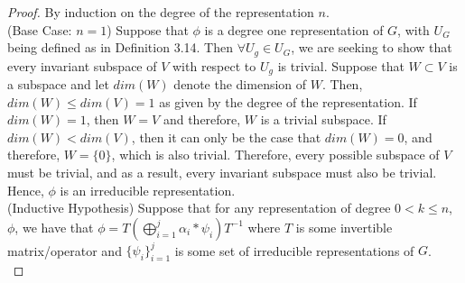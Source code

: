 \begin{proof} By induction on the degree of the representation $n$. \\

(Base Case: $n = 1$) Suppose that $\phi$ is a degree one representation of $G$, with $U_G$ being defined as in Definition 3.14. Then $\forall U_g \in U_G$, we are seeking to show that every invariant subspace of $V$ with respect to $U_g$ is trivial. Suppose that $W \subset V$ is a subspace and let $dim(W)$ denote the dimension of $W$. Then, $dim(W) \leq dim(V) = 1$ as given by the degree of the representation. If $dim(W) = 1$, then $W=V$ and therefore, $W$ is a trivial subspace. If $dim(W) < dim(V)$, then it can only be the case that $dim(W) = 0$, and therefore, $W= \{0\}$, which is also trivial. Therefore, every possible subspace of $V$ must be trivial, and as a result, every invariant subspace must also be trivial. Hence, $\phi$ is an irreducible representation. \\

(Inductive Hypothesis) Suppose that for any representation of degree $0<k\leq n$, $\phi$, we have that $\phi =T\left(\bigoplus_{i=1}^j \alpha_i*\psi_i\right)T^{-1}$ where $T$ is some invertible matrix/operator and $\{\psi_i\}_{i=1}^j$ is some set of irreducible representations of $G$. \\


\end{proof}
